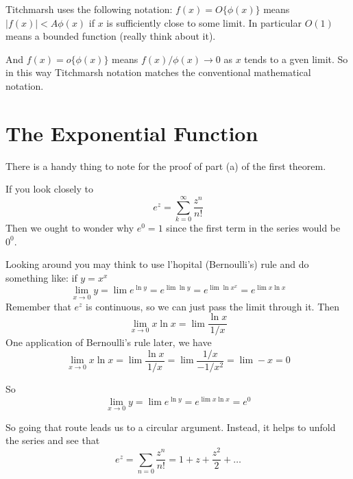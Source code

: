 Titchmarsh uses the following notation:
$f(x) = O\{\phi(x)\}$ means $|f(x)| < A\phi(x)$ if $x$ is sufficiently close to some limit.
In particular $O(1)$ means a bounded function (really think about it).

And $f(x) = o\{\phi(x)\}$ means $f(x) / \phi(x) \rightarrow 0$ as $x$ tends to a gven limit.
So in this way Titchmarsh notation matches the conventional mathematical notation.

\section{The Exponential Function}

There is a handy thing to note for the proof of part (a) of the first theorem.

If you look closely to
$$
e^z = \sum_{k=0}^{\infty} \frac{z^n}{n!}
$$
Then we ought to wonder why $e^0 = 1$ since the first term in the series would be $0^0$.

Looking around you may think to use l'hopital (Bernoulli's) rule and do something like:
if $y = x^x$
$$
\lim_{x\rightarrow 0} y = \lim e^{\ln y} = e^{\lim \ln y} = e^{\lim \ln x^x} = e^{\lim x \ln x}
$$
Remember that $e^z$ is continuous, so we can just pass the limit through it.
Then
$$
\lim_{x\rightarrow 0} x \ln x = \lim \frac{\ln x}{1/x}
$$
One application of Bernoulli's rule later, we have
$$
\lim_{x\rightarrow 0} x \ln x = \lim \frac{\ln x}{1/x} = \lim \frac{1/x}{-1/x^2} = \lim -x = 0
$$

So
$$
\lim_{x\rightarrow 0} y = \lim e^{\ln y} = e^{\lim x \ln x} = e^0
$$

So going that route leads us to a circular argument.
Instead, it helps to unfold the series and see that
$$
e^z = \sum_{n=0} \frac{z^n}{n!} = 1 + z + \frac{z^2}{2} + \ldots
$$